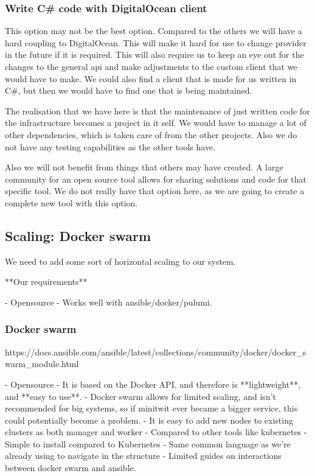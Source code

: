 \subsubsection{Write C\# code with DigitalOcean client}

This option may not be the best option. Compared to the others we will have a hard coupling to DigitalOcean. This will make it hard for use to change provider in the future if it is required. This will also require us to keep an eye out for the changes to the general api and make adjustments to the custom client that we would have to make. We could also find a client that is made for us written in C#, but then we would have to find one that is being maintained.

The realisation that we have here is that the maintenance of just written code for the infrastructure becomes a project in it self. We would have to manage a lot of other dependencies, which is taken care of from the other projects. Also we do not have any testing capabilities as the other tools have.

Also we will not benefit from things that others may have created. A large community for an open source tool allows for sharing solutions and code for that specific tool. We do not really have that option here, as we are going to create a complete new tool with this option.

\subsection{Scaling: Docker swarm}

We need to add some sort of horizontal scaling to our system.

**Our requirements**

- Opensource
- Works well with ansible/docker/pulumi.

\subsubsection{Docker swarm}

https://docs.ansible.com/ansible/latest/collections/community/docker/docker_swarm_module.html

- Opensource
- It is based on the Docker API, and therefore is **lightweight**, and **easy to use**.
- Docker swarm allows for limited scaling, and isn’t recommended for big systems, so if minitwit ever became a bigger service, this could potentially become a problem.
- It is easy to add new nodes to existing clusters as both manager and worker
- Compared to other tools like kubernetes
- Simple to install compared to Kubernetes
- Same common language as we’re already using to navigate in the structure
- Limited guides on interactions between docker swarm and ansible.

